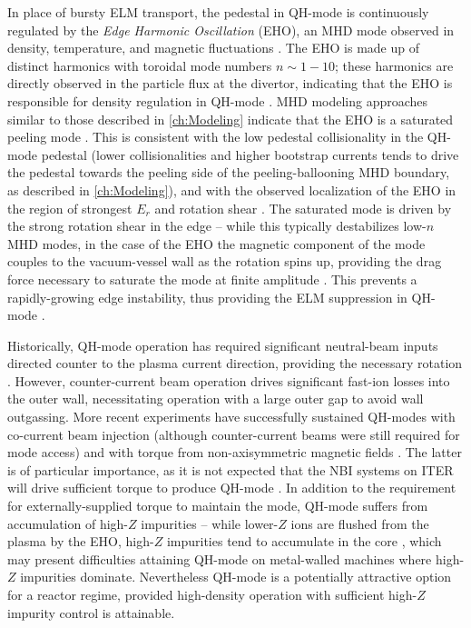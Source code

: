 In place of bursty ELM transport, the pedestal in QH-mode is continuously regulated by the \emph{Edge Harmonic Oscillation} (EHO), an MHD mode observed in density, temperature, and magnetic fluctuations \cite{Burrell2002}.  The EHO is made up of distinct harmonics with toroidal mode numbers $n \sim 1-10$; these harmonics are directly observed in the particle flux at the divertor, indicating that the EHO is responsible for density regulation in QH-mode \cite{Doyle2001}.  MHD modeling approaches similar to those described in \cref{ch:Modeling} indicate that the EHO is a saturated peeling mode \cite{Snyder2007,Osborne2008,Snyder2012}.  This is consistent with the low pedestal collisionality in the QH-mode pedestal (lower collisionalities and higher bootstrap currents tends to drive the pedestal towards the peeling side of the peeling-ballooning MHD boundary, as described in \cref{ch:Modeling}), and with the observed localization of the EHO in the region of strongest $E_r$ and rotation shear \cite{Burrell2001}.  The saturated mode is driven by the strong rotation shear in the edge -- while this typically destabilizes low-$n$ MHD modes, in the case of the EHO the magnetic component of the mode couples to the vacuum-vessel wall as the rotation spins up, providing the drag force necessary to saturate the mode at finite amplitude \cite{Burrell2009}.  This prevents a rapidly-growing edge instability, thus providing the ELM suppression in QH-mode \cite{Snyder2012}.

Historically, QH-mode operation has required significant neutral-beam inputs directed counter to the plasma current direction, providing the necessary rotation \cite{Burrell2002}.  However, counter-current beam operation drives significant fast-ion losses into the outer wall, necessitating operation with a large outer gap to avoid wall outgassing.  More recent experiments have successfully sustained QH-modes with co-current beam injection (although counter-current beams were still required for mode access) \cite{Burrell2009} and with torque from non-axisymmetric magnetic fields \cite{Garofalo2011,Burrell2013}.  The latter is of particular importance, as it is not expected that the NBI systems on ITER will drive sufficient torque to produce QH-mode \cite{Garofalo2011}.  In addition to the requirement for externally-supplied torque to maintain the mode, QH-mode suffers from accumulation of high-$Z$ impurities -- while lower-$Z$ ions are flushed from the plasma by the EHO, high-$Z$ impurities tend to accumulate in the core \cite{Doyle2001,Suttrop2005}, which may present difficulties attaining QH-mode on metal-walled machines where high-$Z$ impurities dominate.  Nevertheless QH-mode is a potentially attractive option for a reactor regime, provided high-density operation with sufficient high-$Z$ impurity control is attainable.

